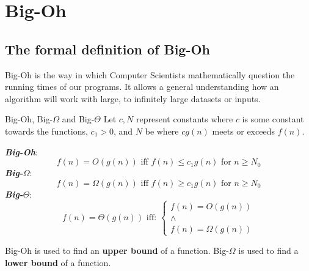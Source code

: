 \section{Big-Oh}
\subsection{The formal definition of Big-Oh}

Big-Oh is the way in which Computer Scientists mathematically question the running times of our programs. It allows a general understanding how an algorithm will work with large, to infinitely large datasets or inputs.
\begin{definition}{Big-Oh, Big-$\Omega$ and Big-$\Theta$}{}
    Let $c, N$ represent constants where $c$ is some constant towards the functions, $c_1 > 0$, and $N$ be where $cg(n)$ meets or exceeds $f(n)$.
    \par
    \textbf{\emph{Big-Oh}}:
    \begin{equation*}
        f(n) = O(g(n)) \text{ iff } f(n) \le c_1g(n) \text{ for } n \ge N_0
    \end{equation*}
    \textbf{\emph{Big-$\Omega$}}:
    \begin{equation*}
        f(n) = \Omega(g(n)) \text{ iff } f(n) \ge c_1g(n) \text{ for } n \ge N_0
    \end{equation*}
    \textbf{\emph{Big-$\Theta$}}:
    \begin{equation*}
        f(n) = \Theta(g(n)) \text{ iff: }   \begin{cases}
                                                f(n) = O(g(n)) \\
                                                \wedge \\
                                                f(n) = \Omega(g(n))
                                            \end{cases}
    \end{equation*}
\end{definition}

Big-Oh is used to find an \textbf{upper bound} of a function. Big-$\Omega$ is used to find a \textbf{lower bound} of a function.